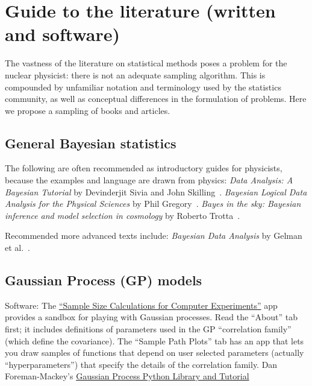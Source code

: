 \section{Guide to the literature (written and software)}  \label{sec:literature}

\bi
  \I The vastness of the literature on statistical methods poses a problem for the
      nuclear physicist: there is not an adequate sampling algorithm.  This is compounded
      by unfamiliar notation and terminology used by the statistics community, as well
      as conceptual differences in the formulation of problems.
  \I Here we propose a sampling of books and articles.
\ei


\subsection{General Bayesian statistics} \label{subsec:gen_bayesian_lit}

The following are often recommended as introductory guides for
physicists, because the examples and language are drawn from physics:
\bi
  \I \textit{Data Analysis: A Bayesian Tutorial} by Devinderjit Sivia and John Skilling~\cite{Sivia:2006}.
  \I \textit{Bayesian Logical Data Analysis for the Physical Sciences} by Phil Gregory~\cite{Gregory:2005}.
  \I \textit{Bayes in the sky: Bayesian inference and model selection in cosmology}
   by Roberto Trotta~\cite{Trotta:2008qt}.
\ei

Recommended more advanced texts include:
\bi
  \I \textit{Bayesian Data Analysis} by Gelman et al.~\cite{Gelman03}.
\ei


\subsection{Gaussian Process (GP) models} \label{subsec:GP_lit}

Software:
\bi
 \I
     The \href{https://harario.shinyapps.io/Sample_Size_Shiny/}{``Sample Size Calculations for Computer Experiments''} app provides a sandbox for playing with
     Gaussian processes.  Read the ``About'' tab first; it includes definitions
     of parameters used in the GP ``correlation family'' (which define the covariance).
     The ``Sample Path Plots'' tab has an app that lets you draw samples of functions
     that depend on user selected parameters (actually ``hyperparameters'') that specify 
     the details of the correlation family.  
 \I Dan Foreman-Mackey's \href{http://dan.iel.fm/george/current/user/model/}{Gaussian Process Python Library and Tutorial}
\ei    


